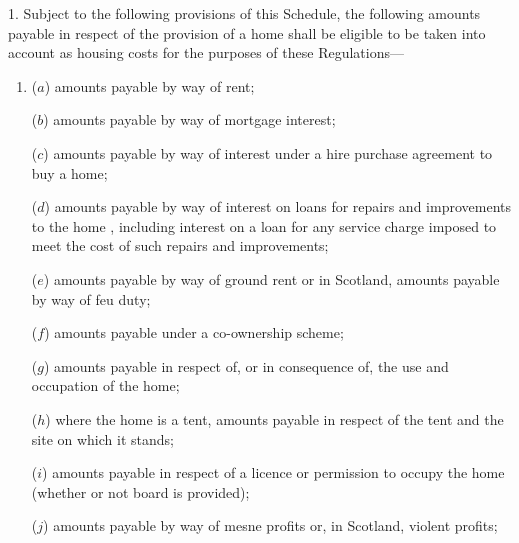\documentclass[12pt,a4paper]{article}
\begin{document}
1.  Subject to the following provisions of this Schedule, 
the following amounts payable  %
in respect of the provision of a home shall be eligible to be taken into account as housing costs for the purposes of these Regulations—
\begin{enumerate}\item[]
($a$) 
amounts payable by way of  %
rent;


($b$) amounts payable by way of mortgage interest;

($c$) 
amounts payable by way of interest  %
under a hire purchase agreement to buy a home;

($d$) 
amounts payable by way of interest  %
on loans for repairs and improvements to the home%
, including interest on a loan for any service charge imposed to meet the cost of such repairs and improvements; %

($e$) 
amounts payable  %
by way of ground rent or in Scotland, 
amounts payable  %
by way of feu duty;

($f$) 
amounts payable  %
under a co-ownership scheme;

($g$) 
amounts payable  %
in respect of, or in consequence of, the use and occupation of the home;

($h$) where the home is a tent, 
amounts payable  %
in respect of the tent and the site on which it stands;

($i$) 
amounts payable  %
in respect of a licence or permission to occupy the home (whether or not board is provided);

($j$) 
amounts payable  %
by way of mesne profits or, in Scotland, violent profits;


\end{enumerate}
\end{document}
